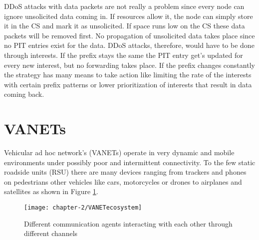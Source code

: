 \vspace{5mm} %

DDoS attacks with data packets are not really a problem since every node can ignore unsolicited data coming in. If resources allow it, the node can simply store it in the CS and mark it as unsolicited. If space runs low on the CS these data packets will be removed first. No propagation of unsolicited data takes place since no PIT entries exist for the data. DDoS attacks, therefore, would have to be done through interests. If the prefix stays the same the PIT entry get's updated for every new interest, but no forwarding takes place. If the prefix changes constantly the strategy has many means to take action like limiting the rate of the interests with certain prefix patterns or lower prioritization of interests that result in data coming back. 

\newpage
\section{VANETs}

Vehicular ad hoc network's (VANETs) operate in very dynamic and mobile environments under possibly poor and intermittent connectivity. To the few static roadside units (RSU) there are many devices ranging from trackers and phones on pedestrians other vehicles like cars, motorcycles or drones to airplanes and satellites as shown in Figure \ref{fig:VANETecosystem}.

\vspace{5mm} %

\begin{figure}[H]
  \centering
  \texttt{[image: chapter-2/VANETecosystem]}
  \caption{Different communication agents interacting with each other through different channels}
  \label{fig:VANETecosystem}
\end{figure}

\vspace{5mm} %

